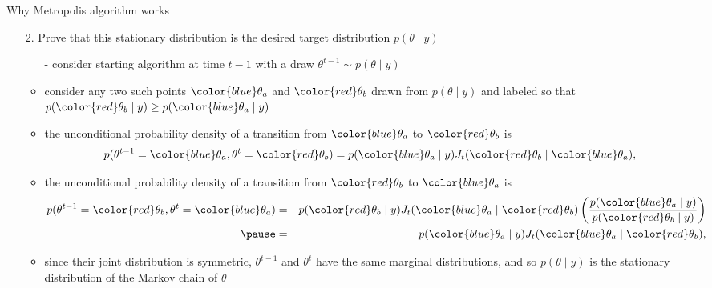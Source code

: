 \documentclass[finnish,english,t]{beamer}
\begin{document}
\begin{frame}{Why Metropolis algorithm works}

  \begin{itemize}
  \item[2.] Prove that this stationary distribution is the desired target distribution $p(\theta \mid y)$
    \begin{itemize}
    \item[-] consider starting algorithm at time $t-1$ with a draw
      $\theta^{t-1} \sim p(\theta \mid y)$ 
    \item<2->[-] consider any two such points ${\color{blue} \theta_a}$ and ${\color{red} \theta_b}$ drawn
      from $p(\theta \mid y)$ and labeled so that
      $p({\color{red} \theta_b} \mid y)\geq p({\color{blue} \theta_a} \mid y)$
    \item<3->[-] the unconditional probability density of a transition from ${\color{blue} \theta_a}$ to ${\color{red} \theta_b}$ is
      \vspace{-0.5\baselineskip}
      \begin{equation*}
        p(\theta^{t-1}={\color{blue} \theta_a},\theta^{t}={\color{red} \theta_b})=
        p({\color{blue} \theta_a} \mid y)J_t({\color{red} \theta_b} \mid {\color{blue} \theta_a}),
      \end{equation*}
      \vspace{-1\baselineskip}
    \item<4->[-] the unconditional probability density of a transition from ${\color{red} \theta_b}$ to ${\color{blue} \theta_a}$ is
      \vspace{-0.5\baselineskip}
      \begin{eqnarray*}
        p(\theta^{t-1}={\color{red} \theta_b}, \theta^{t}={\color{blue} \theta_a}) & = &
        p({\color{red} \theta_b} \mid y)J_t({\color{blue} \theta_a} \mid {\color{red} \theta_b})\left(\frac{p({\color{blue} \theta_a} \mid y)}{p({\color{red} \theta_b} \mid y)}\right)\\
        \pause &  = &  p({\color{blue} \theta_a} \mid y)J_t({\color{blue} \theta_a} \mid {\color{red} \theta_b}),
      \end{eqnarray*}
      \pause
    \item<6->[-] since their joint distribution is symmetric, $\theta^{t-1}$ and $\theta^t$
       have the same marginal distributions, and so
      $p(\theta \mid y)$ is the stationary distribution of the Markov chain of $\theta$
    \end{itemize}
  \end{itemize}

\end{frame}
\end{document}
